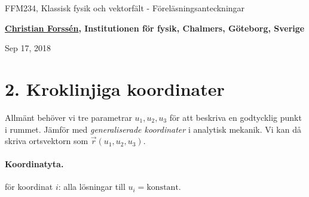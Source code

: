 \documentclass[%
oneside,                 %
final,                   %
10pt]{article}
\begin{document}

\newcommand{\exercisesection}[1]{\subsection*{#1}}







\thispagestyle{empty}

\begin{center}
{\LARGE\bf
\begin{spacing}{1.25}
FFM234, Klassisk fysik och vektorfält - Föreläsningsanteckningar
\end{spacing}
}
\end{center}


\begin{center}
{\bf \href{{http://fy.chalmers.se/subatom/tsp/}}{Christian Forssén}, Institutionen för fysik, Chalmers, Göteborg, Sverige${}^{}$} \\ [0mm]
\end{center}

\begin{center}
\end{center}
    

\begin{center}
Sep 17, 2018
\end{center}

\vspace{1cm}


\section{2. Kroklinjiga koordinater}

Allmänt behöver vi tre parametrar $u_1, u_2, u_3$ för att beskriva en godtycklig punkt i rummet. Jämför med \emph{generaliserade koordinater} i analytisk mekanik. Vi kan då skriva ortsvektorn som $\vec{r}(u_1, u_2, u_3)$.  

\paragraph{Koordinatyta.}
för koordinat $i$: alla lösningar till $u_i = \mathrm{konstant}$.
\end{document}
